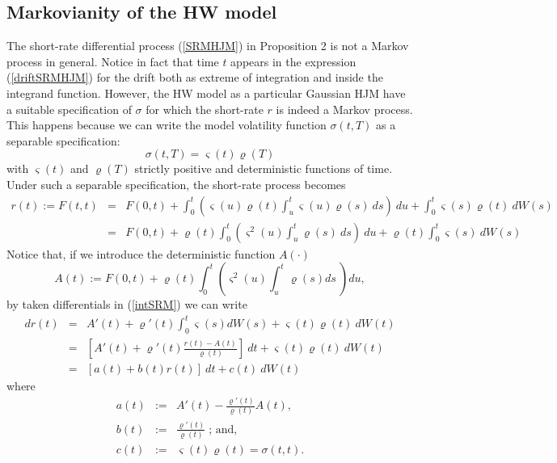 \subsection{Markovianity of the HW model}
The short-rate differential process (\ref{SRMHJM}) in Proposition 2 is
not a Markov process in general. Notice in fact that time $t$ appears in the
expression (\ref{driftSRMHJM}) for the drift both as extreme of
integration and inside the integrand function. However, the HW model
as a particular Gaussian HJM have a suitable specification of $\sigma$
for which the short-rate $r$ is indeed a Markov process. This happens
because we can write the model volatility function $\sigma(t,T)$ as a
separable specification:
\begin{equation} 
\label{diffusionHWHJMseparable}
\sigma(t,T)=\varsigma(t)\varrho(T)
\end{equation} 
with $\varsigma(t)$ and $\varrho(T)$ strictly positive and deterministic
functions of time. Under such a separable specification, the
short-rate process becomes
\begin{equation}
\label{intSRM}
\begin{array}{rcl}
r(t):=F(t,t)&=&F(0,t)+\int_0^t \left(\varsigma(u)\varrho(t)\int_u^t
  \varsigma(u) \varrho(s)\: ds\right)\: du +\int_0^t \varsigma(s)
\varrho(t)\: dW(s) \\ 
&=& F(0,t)+\varrho(t)\int_0^t \left(\varsigma^2(u)\int_u^t \varrho(s)
  \:ds \right)\:du +\varrho(t) \int_0^t \varsigma(s) \: dW(s) 
\end{array}
\end{equation}
Notice that, if we introduce the deterministic function $A(\cdot)$  
$$
A(t):=F(0,t)+\varrho(t) \int_0^t \left( \varsigma^2(u) \int_u^t \varrho(s)
ds\: \right) du,
$$
by taken differentials in (\ref{intSRM}) we can write
\begin{equation}
\label{diffSRM}
\begin{array}{rcl}
dr(t)&=& A'(t)+\varrho'(t) \int_0^t \varsigma(s) dW(s)
+\varsigma(t)\varrho(t)\: dW(t)\\ 
&=& \left[ A'(t)+\varrho'(t) \displaystyle\frac{r(t)-A(t)}{\varrho(t)}\right]\:
dt+\varsigma(t)\varrho(t)\: dW(t)\\
&=& \left[ a(t)+b(t) r(t)\right]\:dt+c(t)\: dW(t)
\end{array}
\end{equation}
where \begin{equation}
\begin{array}{rcl}
a(t) &:=& A'(t)-\displaystyle\frac{\varrho'(t)}{\varrho(t)}A(t),\\ 
b(t) &:=& \displaystyle\frac{\varrho'(t)}{\varrho(t)}\; \textrm{; and,}\\
c(t) &:=& \varsigma(t)\varrho(t)=\sigma(t,t).
\end{array}
\end{equation}
